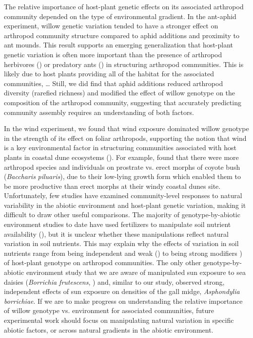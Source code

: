 \documentclass[11pt]{article}
\begin{document}
The relative importance of host-plant genetic effects on its associated arthropod community depended on the type of environmental gradient. In the ant-aphid experiment, willow genetic variation tended to have a stronger effect on arthropod community structure compared to aphid additions and proximity to ant mounds. This result supports an emerging generalization that host-plant genetic variation is often more important than the presence of arthropod herbivores (\citealt{Johnson_2008, McGuire2007, Fritz1986, Cronin2001}) or predatory ants (\citealt{Abdala_Roberts_2012, Mooney_2008, Johnson_2008}) in structuring arthropod communities. This is likely due to host plants providing all of the habitat for the associated communities, … Still, we did find that aphid additions reduced arthropod diversity (rarefied richness) and modified the effect of willow genotype on the composition of the arthropod community, suggesting that accurately predicting community assembly requires an understanding of both factors. 

In the wind experiment, we found that wind exposure dominated willow genotype in the strength of its effect on foliar arthropods, supporting the notion that wind is a key environmental factor in structuring communities associated with host plants in coastal dune ecosystems (\citealt{Miller_1999, Crutsinger_2010, Crutsinger_2014}). For example, \cite{Crutsinger_2014} found that there were more arthropod species and individuals on prostrate vs. erect morphs of coyote bush (\emph{Baccharis} \emph{piluaris}), due to their low-lying growth form which enabled them to be more productive than erect morphs at their windy coastal dunes site. Unfortunately, few studies have examined community-level responses to natural variability in the abiotic environment and host-plant genetic variation, making it difficult to draw other useful comparisons. The majority of genotype-by-abiotic environment studies to date have used fertilizers to manipulate soil nutrient availability (\citealt{Abdala_Roberts_2012, Orians_1996, Rossi_1998}), but it is unclear whether these manipulations reflect natural variation in soil nutrients. This may explain why the effects of variation in soil nutrients range from being independent and weak (\citealt{Abdala_Roberts_2012}) to being strong modifiers \citealt{Orians_1996}) of host-plant genotype on arthropod communities. The only other genotype-by-abiotic environment study that we are aware of manipulated sun exposure to sea daisies (\textit{Borrichia frutescens}, \citealt{Rossi_1998}) and, similar to our study, observed strong, independent effects of sun exposure on densities of the gall midge, \textit{Asphondylia borrichiae}. If we are to make progress on understanding the relative importance of willow genotype vs. environment for associated communities, future experimental work should focus on manipulating natural variation in specific abiotic factors, or across natural gradients in the abiotic environment. 
% 
% 
\end{document}
